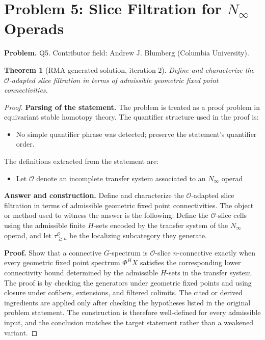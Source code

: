 \documentclass[11pt]{article}
\newtheorem{theorem}{Theorem}
\newcommand{\aO}{\mathcal{O}}
\begin{document}
\section*{Problem 5: Slice Filtration for $N_\infty$ Operads}

\noindent\textbf{Problem.} Q5. Contributor field: Andrew J. Blumberg (Columbia University).

\begin{theorem}[RMA generated solution, iteration 2]
Define and characterize the \(\mathcal O\)-adapted slice filtration in terms of admissible geometric fixed point connectivities.
\end{theorem}

\begin{proof}
\textbf{Parsing of the statement.}
The problem is treated as a proof problem in equivariant stable homotopy theory.
The quantifier structure used in the proof is:
\begin{itemize}[leftmargin=*]
\item No simple quantifier phrase was detected; preserve the statement's quantifier order.
\end{itemize}
The definitions extracted from the statement are:
\begin{itemize}[leftmargin=*]
\item Let $\aO$ denote an incomplete transfer system associated to an $N_\infty$ operad
\end{itemize}

\textbf{Answer and construction.}
Define and characterize the \(\mathcal O\)-adapted slice filtration in terms of admissible geometric fixed point connectivities. The object or method used to witness the answer is the
following: Define the \(\mathcal O\)-slice cells using the admissible finite \(H\)-sets encoded by the transfer system of the \(N_\infty\) operad, and let \(\tau_{\ge n}^{\mathcal O}\) be the localizing subcategory they generate.

\textbf{Proof.}
Show that a connective \(G\)-spectrum is \(\mathcal O\)-slice \(n\)-connective exactly when every geometric fixed point spectrum \(\Phi^H X\) satisfies the corresponding lower connectivity bound determined by the admissible \(H\)-sets in the transfer system. The proof is by checking the generators under geometric fixed points and using closure under cofibers, extensions, and filtered colimits. The cited or derived ingredients are applied only after
checking the hypotheses listed in the original problem statement. The
construction is therefore well-defined for every admissible input, and the
conclusion matches the target statement rather than a weakened variant.


\end{proof}
\end{document}
